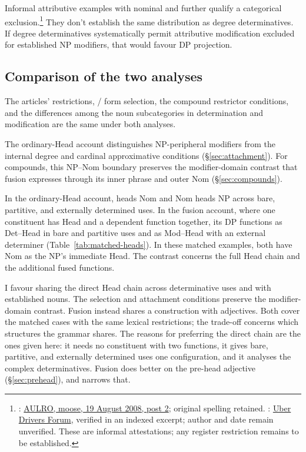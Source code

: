 \documentclass[12pt]{article}
\begin{document}
Informal attributive examples with nominal  and  further qualify a categorical exclusion.\footnote{: \href{https://www.aulro.com/afvb/motor-cycling/61858-my-track-day-phillip-island-motogp-track-post798794.html}{AULRO, moose, 19 August 2008, post 2}; original spelling retained. : \href{https://www.uberpeople.net/threads/let-s-play-would-you-have-taken-this-trip.395130/}{Uber Drivers Forum}, verified in an indexed excerpt; author and date remain unverified. These are informal attestations; any register restriction remains to be established.} They don't establish the same distribution as degree determinatives. If degree determinatives systematically permit attributive modification excluded for established NP modifiers, that would favour DP projection.

\subsection{Comparison of the two analyses}\label{sec:costs}

The articles' restrictions, / form selection, the compound restrictor conditions, and the differences among the noun subcategories in determination and modification are the same under both analyses.

The ordinary-Head account distinguishes NP-peripheral modifiers from the internal degree and cardinal approximative conditions (§\ref{sec:attachment}). For compounds, this NP--Nom boundary preserves the modifier-domain contrast that fusion expresses through its inner phrase and outer Nom (§\ref{sec:compounds}).

In the ordinary-Head account,  heads Nom and Nom heads NP across bare, partitive, and externally determined uses. In the fusion account, where one constituent has Head and a dependent function together, its DP functions as Det--Head in bare and partitive uses and as Mod--Head with an external determiner (Table~\ref{tab:matched-heads}). In these matched examples, both have Nom as the NP's immediate Head. The contrast concerns the full Head chain and the additional fused functions.

I favour sharing the direct Head chain across determinative uses and with established nouns. The selection and attachment conditions preserve the modifier-domain contrast. Fusion instead shares a construction with adjectives. Both cover the matched cases with the same lexical restrictions; the trade-off concerns which structures the grammar shares. The reasons for preferring the direct chain are the ones given here: it needs no constituent with two functions, it gives bare, partitive, and externally determined uses one configuration, and it analyses the complex determinatives. Fusion does better on the pre-head adjective (§\ref{sec:prehead}), and  narrows that.
\end{document}
